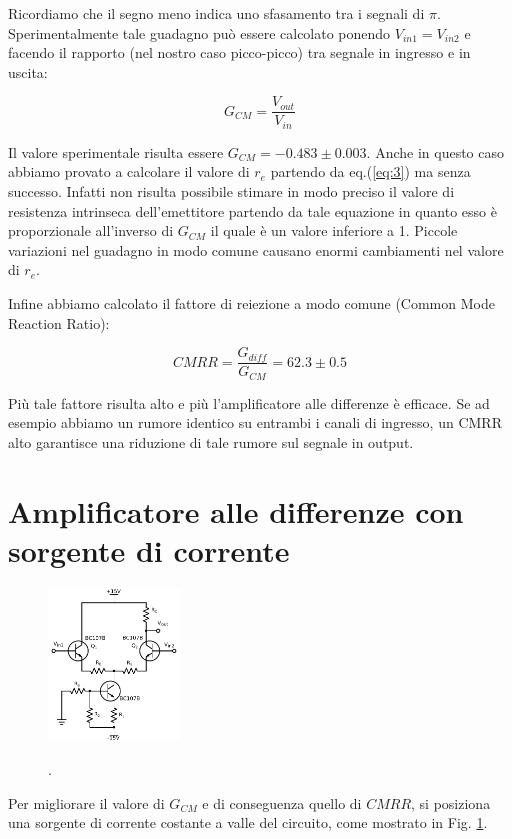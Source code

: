 Ricordiamo che il segno meno indica uno sfasamento tra i segnali di $\pi$.
Sperimentalmente tale guadagno può essere calcolato ponendo $V_{in1}=V_{in2}$ e facendo il rapporto (nel nostro caso picco-picco) tra segnale in ingresso e in uscita:

$$G_{CM}=\frac{V_{out}}{V_{in}}$$

Il valore sperimentale risulta essere $G_{CM} = -0.483 \pm 0.003$. Anche in questo caso abbiamo provato a calcolare il valore di $r_e$ partendo da eq.(\ref{eq:3}) ma senza successo.
Infatti non risulta possibile stimare in modo preciso il valore di resistenza intrinseca dell'emettitore partendo da tale equazione in quanto esso è proporzionale all'inverso di $G_{CM}$ il quale è un valore inferiore a 1.
Piccole variazioni nel guadagno in modo comune causano enormi cambiamenti nel valore di $r_e$. 

Infine abbiamo calcolato il fattore di reiezione a modo comune (Common Mode Reaction Ratio):

\begin{equation}
CMRR=\frac{G_{diff}}{G_{CM}}=62.3\pm0.5
\end{equation}

Più tale fattore risulta alto e più l'amplificatore alle differenze è efficace. Se ad esempio abbiamo un rumore identico su entrambi i canali di ingresso, un CMRR alto garantisce una riduzione di tale rumore sul segnale in output.

\section{Amplificatore alle differenze con sorgente di corrente}
\begin{figure}
	\caption{.}
	\includegraphics[width=35mm]{cc2.pdf}
	\label{fig:cc2}
\end{figure}


Per migliorare il valore di $G_{CM}$ e di conseguenza quello di $CMRR$, si posiziona una sorgente di corrente costante a valle del circuito, come mostrato in Fig. \ref{fig:cc2}.

